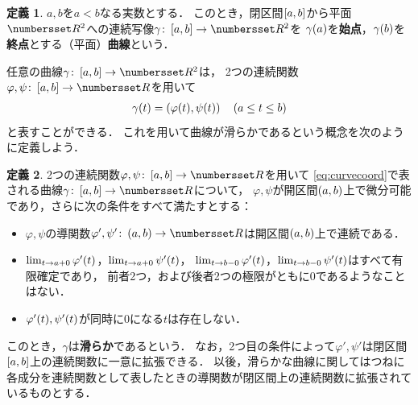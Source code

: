 \documentclass[11pt,a4paper]{ltjsarticle}
\newcommand*{\definition}[1]{\textbf{#1}}
\newcommand*{\coord}[1]{\paren{#1}}
\theoremstyle{definition}
\newtheorem{dfn}{定義}[section]
\begin{document}
\begin{dfn} \label{dfn:curve}
  $a,b$を$a < b$なる実数とする．
  このとき，閉区間$\interval{c}{a,b}$から平面$\Real^2$への連続写像$\gamma \colon \interval{c}{a,b} \to \Real^2$を
  $\apply{\gamma}{a}$を\definition{始点}，$\apply{\gamma}{b}$を\definition{終点}とする（平面）\definition{曲線}という．
\end{dfn}

任意の曲線$\gamma \colon \interval{c}{a,b} \to \Real^2$は，
2つの連続関数$\varphi, \psi \colon \interval{c}{a,b} \to \Real$を用いて
\begin{align}
  \apply{\gamma}{t} = \coord{\apply{\varphi}{t}, \apply{\psi}{t}} \quad \text{($a \leq t \leq b$)}
  \label{eq:curvecoord}
\end{align}
と表すことができる．
これを用いて曲線が滑らかであるという概念を次のように定義しよう．

\begin{dfn} \label{dfn:smooth}
  2つの連続関数$\varphi, \psi \colon \interval{c}{a,b} \to \Real$を用いて
  \cref{eq:curvecoord}で表される曲線$\gamma \colon \interval{c}{a,b} \to \Real$について，
  $\varphi, \psi$が開区間$\interval{op}{a,b}$上で微分可能であり，さらに次の条件をすべて満たすとする：
  \begin{itemize}
    \item $\varphi, \psi$の導関数$\varphi ', \psi ' \colon \interval{op}{a,b} \to \Real$は開区間$\interval{op}{a,b}$上で連続である．
    \item $\lim_{t \to a + 0}\apply{\varphi '}{t}$，$\lim_{t \to a + 0}\apply{\psi '}{t}$，
          $\lim_{t \to b - 0}\apply{\varphi '}{t}$，$\lim_{t \to b - 0}\apply{\psi '}{t}$はすべて有限確定であり，
          前者2つ，および後者2つの極限がともに0であるようなことはない．
    \item $\apply{\varphi'}{t}, \apply{\psi'}{t}$が同時に0になる$t$は存在しない．
  \end{itemize}
  このとき，$\gamma$は\definition{滑らか}であるという．
  なお，2つ目の条件によって$\varphi', \psi'$は閉区間$\interval{c}{a,b}$上の連続関数に一意に拡張できる．
  以後，滑らかな曲線に関してはつねに各成分を連続関数として表したときの導関数が閉区間上の連続関数に拡張されているものとする．
\end{dfn}
\end{document}

